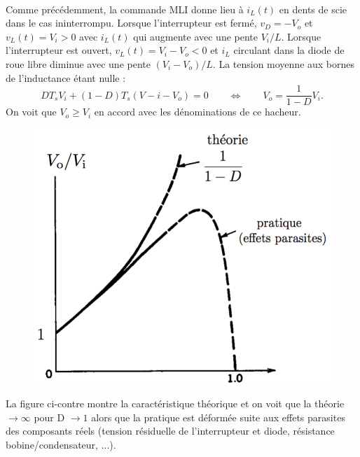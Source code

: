 		\ \\ Comme précédemment, la commande MLI donne lieu à $i_L(t)$ en dents de scie dans le cas ininterrompu. Lorsque l'interrupteur est fermé, $v_D = -V_o$ et $v_L(t) = V_i >0$ avec $i_L(t)$ qui augmente avec une pente $V_i/L$. Lorsque l'interrupteur est ouvert, $v_L(t) = V_i - V_o < 0$ et $i_L$ circulant dans la diode de roue libre diminue avec une pente $(V_i - V_o) /L$. La tension moyenne aux bornes de l'inductance étant nulle :
		\begin{equation}
			DT_s V_i + (1-D)T_s (V-i-V_o) = 0 \qquad \Leftrightarrow \qquad V_o = \frac{1}{1-D}V_i. 
		\end{equation}
		On voit que $V_o \geq V_i$ en accord avec les dénominations de ce hacheur. 
		
		\begin{figure}
		\vspace{-5mm}
		\includegraphics[scale=0.25]{ch5/12}
		\end{figure}	
		La figure ci-contre montre la caractéristique théorique et on voit que la théorie $\rightarrow \infty$ pour D $\rightarrow 1$ alors que la pratique est déformée suite aux effets parasites des composants réels (tension résiduelle de l'interrupteur et diode, résistance bobine/condensateur, ...).   \\\\
		
